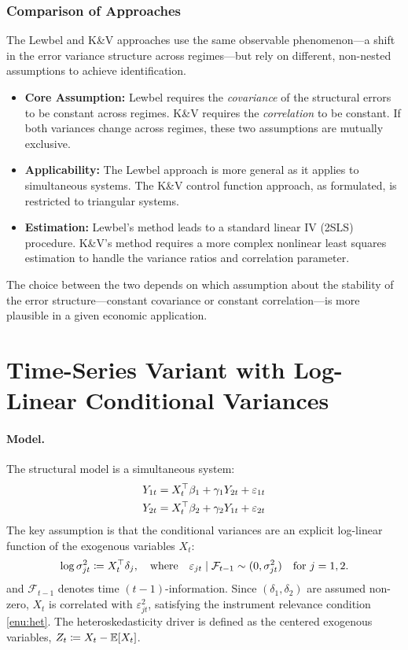 \subsubsection{Comparison of Approaches}
The Lewbel and K\&V approaches use the same observable phenomenon—a shift in the error variance structure across regimes—but rely on different, non-nested assumptions to achieve identification.
\begin{itemize}
\item \textbf{Core Assumption:} Lewbel requires the \emph{covariance} of the structural errors to be constant across regimes. K\&V requires the \emph{correlation} to be constant. If both variances change across regimes, these two assumptions are mutually exclusive.
\item \textbf{Applicability:} The Lewbel approach is more general as it applies to simultaneous systems. The K\&V control function approach, as formulated, is restricted to triangular systems.
\item \textbf{Estimation:} Lewbel's method leads to a standard linear IV (2SLS) procedure. K\&V's method requires a more complex nonlinear least squares estimation to handle the variance ratios and correlation parameter.
\end{itemize}
The choice between the two depends on which assumption about the stability of the error structure—constant covariance or constant correlation—is more plausible in a given economic application.

\section{Time-Series Variant with Log-Linear Conditional Variances}

\label{sec:timeseries}

\paragraph{Model.}

The structural model is a simultaneous system:
\begin{align*}
Y_{1t} & =X_{t}^{\top}\beta_{1}+\gamma_{1}Y_{2t}+\varepsilon_{1t}\\
Y_{2t} & =X_{t}^{\top}\beta_{2}+\gamma_{2}Y_{1t}+\varepsilon_{2t}
\end{align*}
The key assumption is that the conditional variances are an explicit
log-linear function of the exogenous variables $X_{t}$:
\[
\log\sigma_{jt}^{2}\coloneqq X_{t}^{\top}\delta_{j},\quad\text{where}\quad\varepsilon_{jt}\mid\mathcal{F}_{t-1}\sim(0,\sigma_{jt}^{2})\quad\text{for }j=1,2.
\]
and $\mathcal{F}_{t-1}$ denotes time $(t-1)$-information. Since
$(\delta_{1},\delta_{2})$ are assumed non-zero, $X_{t}$ is correlated
with $\varepsilon_{jt}^{2}$, satisfying the instrument relevance
condition \ref{enu:het}. The heteroskedasticity driver is defined
as the centered exogenous variables, $Z_{t}\coloneqq X_{t}-\mathbb{E}[X_{t}]$.

